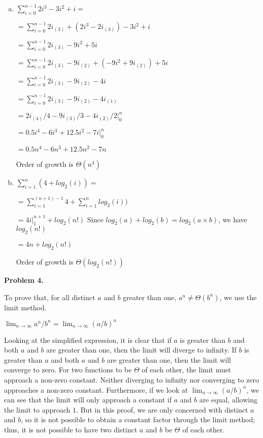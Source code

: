 \documentclass{article}
\begin{document}
		\begin{enumerate}[a.]
			\item $\sum_{i=0}^{n - 1} 2i^3 - 3i^2 + i = $
			
				$ = \sum_{i=0}^{n - 1} 2i_{(3)} + (2i^3 - 2i_{(3)}) - 3i^2 + i$
				
				$ = \sum_{i=0}^{n - 1} 2i_{(3)} - 9i^2 + 5i$
				
				$ = \sum_{i=0}^{n - 1} 2i_{(3)} - 9i_{(2)} + (-9i^2 + 9i_{(2)}) + 5i$
				
				$ = \sum_{i=0}^{n - 1} 2i_{(3)} - 9i_{(2)} - 4i$
				
				$ = \sum_{i=0}^{n - 1} 2i_{(3)} - 9i_{(2)} - 4i_{(1)}$
				
				$ = 2i_{(4)}/4 - 9i_{(3)}/3 - 4i_{(2)}/2 \rvert_{0}^{n}$
				
				$ = 0.5i^4 - 6i^3 + 12.5i^2 - 7i \rvert_{0}^{n}$
				
				$ = 0.5n^4 - 6n^3 + 12.5n^2 - 7n$
				
				Order of growth is $\Theta(n^4)$
				
			\item $\sum_{i=1}^{n} (4 + log_{2} (i)) = $
			
				$ = \sum_{i=1}^{(n + 1) - 1} 4 + \sum_{i=1}^{n} log_{2} (i))$
				
				$ = 4i \rvert_{1}^{n + 1} + log_{2} (n!)$	\hfill Since $log_{2}(a) + log_{2}(b) = log_{2}(a \times b)$, we have $log_{2} (n!)$
				
				$ = 4n + log_{2} (n!)$
				
				Order of growth is $\Theta(log_{2} (n!))$
		\end{enumerate}
	
\textbf{Problem 4.}

	To prove that, for all distinct $a$ and $b$ greater than one, $a^n \neq \Theta(b^n)$, we use the limit method.
	
	$\lim_{n\to\infty} a^n / b^n = \lim_{n\to\infty} (a / b)^n$
	
	Looking at the simplified expression, it is clear that if $a$ is greater than $b$ and both $a$ and $b$ are greater than one, then the limit will diverge to infinity.  If $b$ is greater than $a$ and both $a$ and $b$ are greater than one, then the limit will converge to zero.  For two functions to be $\Theta$ of each other, the limit must approach a non-zero constant.  Neither diverging to infinity nor converging to zero approaches a non-zero constant.  Furthermore, if we look at $\lim_{n\to\infty} (a / b)^n$, we can see that the limit will only approach a constant if $a$ and $b$ are equal, allowing the limit to approach $1$.  But in this proof, we are only concerned with distinct $a$ and $b$, so it is not possible to obtain a constant factor through the limit method; thus, it is not possible to have two distinct $a$ and $b$ be $\Theta$ of each other.
	
\end{document}
